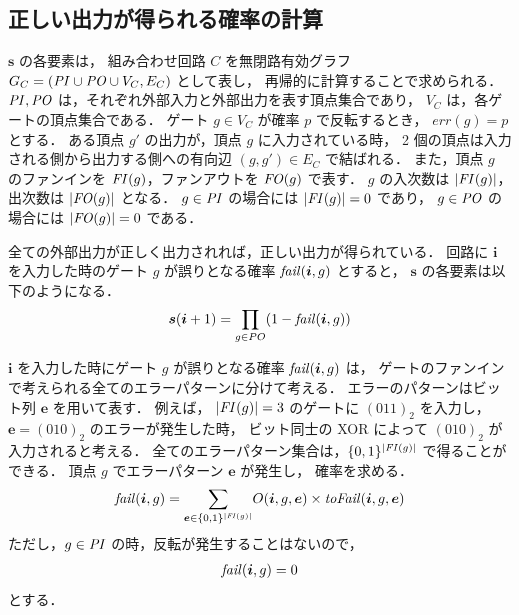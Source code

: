 \subsection{正しい出力が得られる確率の計算}

${\bm s}$ の各要素は，
組み合わせ回路 $C$ を無閉路有効グラフ $G_C = ({\it PI} \cup {\it PO} \cup V_C, E_C)$ として表し，
再帰的に計算することで求められる．
${\it PI}, {\it PO}$ は，それぞれ外部入力と外部出力を表す頂点集合であり，
$V_C$ は，各ゲートの頂点集合である．
ゲート $g \in V_C$ が確率 $p$ で反転するとき， $err(g) = p$ とする．
ある頂点 $g'$ の出力が，頂点 $g$ に入力されている時，
2 個の頂点は入力される側から出力する側への有向辺 $(g, g') \in E_C$ で結ばれる．
また，頂点 $g$ のファンインを ${\it FI}(g)$，ファンアウトを ${\it FO}(g)$ で表す．
$g$ の入次数は $|{\it FI}(g)|$，出次数は $|{\it FO}(g)|$ となる．
$g \in {\it PI}$ の場合には $|{\it FI}(g)| = 0$ であり，
$g \in {\it PO}$ の場合には $|{\it FO}(g)| = 0$ である．

全ての外部出力が正しく出力されれば，正しい出力が得られている．
回路に ${\bm i}$ を入力した時のゲート $g$ が誤りとなる確率 ${\it fail}({\bm i}, g)$ とすると，
${\bm s}$ の各要素は以下のようになる．
\begin{eqnarray}
  {\bm s}({\bm i} + 1) = \prod_{g \in PO}(1 - {\it fail}({\bm i}, g)) \label{eq:allnofail}
\end{eqnarray}

${\bm i}$ を入力した時にゲート $g$ が誤りとなる確率 ${\it fail}({\bm i}, g)$ は，
ゲートのファンインで考えられる全てのエラーパターンに分けて考える．
エラーのパターンはビット列 ${\bm e}$ を用いて表す．
例えば， $|{\it FI}(g)| = 3$ のゲートに $(011)_2$ を入力し，
${\bm e} = (010)_2$ のエラーが発生した時，
ビット同士の XOR によって $(010)_2$ が入力されると考える．
全てのエラーパターン集合は，$\{0, 1\}^{|{\it FI}(g)|}$ で得ることができる．
頂点 $g$ でエラーパターン ${\bm e}$ が発生し，
確率を求める．
\begin{eqnarray}
  {\it fail}({\bm i}, g) = {\displaystyle \sum_{{\bm e} \in \{0, 1\}^{|{\it FI}(g)|}}}
    O({\bm i}, g, {\bm e}) \times {\it toFail}({\bm i}, g, {\bm e}) \label{eq:fail}
\end{eqnarray}
ただし，$g \in {\it PI}$ の時，反転が発生することはないので，
\begin{eqnarray}
  {\it fail}({\bm i}, g) = 0
\end{eqnarray}
とする．

